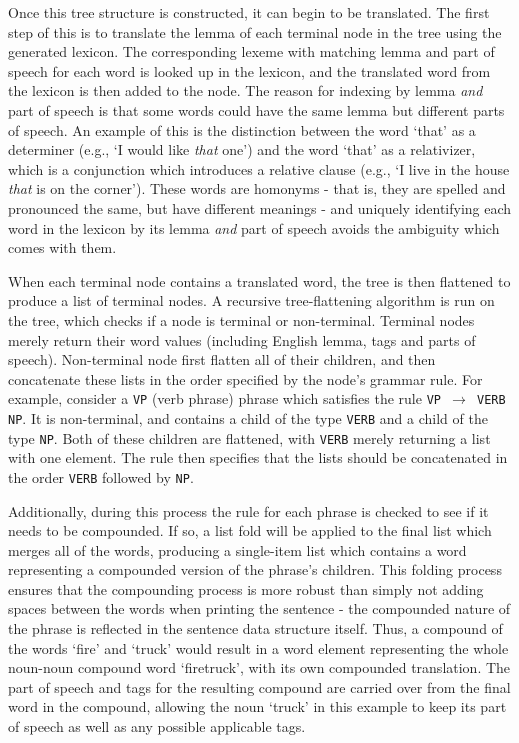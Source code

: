 \documentclass{report}
\begin{document}
	Once this tree structure is constructed, it can begin to be translated. The first step of this is to translate the lemma of each terminal node in the tree using the generated lexicon. The corresponding lexeme with matching lemma and part of speech for each word is looked up in the lexicon, and the translated word from the lexicon is then added to the node. The reason for indexing by lemma \textit{and} part of speech is that some words could have the same lemma but different parts of speech. An example of this is the distinction between the word `that' as a determiner (e.g., `I would like \textit{that} one') and the word `that' as a relativizer, which is a conjunction which introduces a relative clause (e.g., `I live in the house \textit{that} is on the corner'). These words are homonyms - that is, they are spelled and pronounced the same, but have different meanings - and uniquely identifying each word in the lexicon by its lemma \textit{and} part of speech avoids the ambiguity which comes with them.
	
	When each terminal node contains a translated word, the tree is then flattened to produce a list of terminal nodes. A recursive tree-flattening algorithm is run on the tree, which checks if a node is terminal or non-terminal. Terminal nodes merely return their word values (including English lemma, tags and parts of speech). Non-terminal node first flatten all of their children, and then concatenate these lists in the order specified by the node's grammar rule. For example, consider a \texttt{VP} (verb phrase) phrase which satisfies the rule \texttt{VP $\rightarrow$ VERB NP}. It is non-terminal, and contains a child of the type \texttt{VERB} and a child of the type \texttt{NP}. Both of these children are flattened, with \texttt{VERB} merely returning a list with one element. The rule then specifies that the lists should be concatenated in the order \texttt{VERB} followed by \texttt{NP}.
	
	Additionally, during this process the rule for each phrase is checked to see if it needs to be compounded. If so, a list fold will be applied to the final list which merges all of the words, producing a single-item list which contains a word representing a compounded version of the phrase's children. This folding process ensures that the compounding process is more robust than simply not adding spaces between the words when printing the sentence - the compounded nature of the phrase is reflected in the sentence data structure itself. Thus, a compound of the words `fire' and `truck' would result in a word element representing the whole noun-noun compound word `firetruck', with its own compounded translation. The part of speech and tags for the resulting compound are carried over from the final word in the compound, allowing the noun `truck' in this example to keep its part of speech as well as any possible applicable tags.
	
\end{document}
